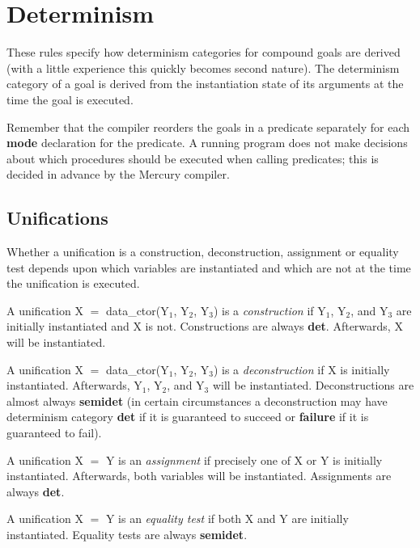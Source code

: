 \documentclass[a4paper,11pt,notitlepage,onecolumn]{book}
\begin{document}
\section{Determinism}

These rules specify how determinism categories for compound goals are
derived (with a little experience this quickly becomes second nature).
The determinism category of a goal is derived from the instantiation state
of its arguments at the time the goal is executed.

\Note Remember that the compiler reorders the goals in a predicate
separately for each \textsf{\textbf{mode}} declaration for the predicate.  A running program
does not make decisions about which procedures should be executed when
calling predicates; this is decided in advance by the Mercury compiler.

\subsection*{Unifications}

Whether a unification is a construction, deconstruction, assignment or
equality test depends upon which variables are instantiated and which are
not at the time the unification is executed.

A unification \textsf{X {\ensuremath{=}} data\_ctor(Y$_{1}$, Y$_{2}$, Y$_{3}$)} is a \emph{construction} if \textsf{Y$_{1}$},
\textsf{Y$_{2}$}, and \textsf{Y$_{3}$} are initially instantiated and \textsf{X} is not.  Constructions are
always \textsf{\textbf{det}}.  Afterwards, \textsf{X} will be instantiated.

A unification \textsf{X {\ensuremath{=}} data\_ctor(Y$_{1}$, Y$_{2}$, Y$_{3}$)} is a \emph{deconstruction} if \textsf{X}
is initially instantiated.  Afterwards, \textsf{Y$_{1}$}, \textsf{Y$_{2}$}, and \textsf{Y$_{3}$} will be
instantiated.  Deconstructions are almost always \textsf{\textbf{semidet}} (in certain
circumstances a deconstruction may have determinism category \textsf{\textbf{det}} if it is
guaranteed to succeed or \textsf{\textbf{failure}} if it is guaranteed to fail).

A unification \textsf{X {\ensuremath{=}} Y} is an \emph{assignment} if precisely one of \textsf{X} or \textsf{Y}
is initially instantiated.  Afterwards, both variables will be instantiated.
Assignments are always \textsf{\textbf{det}}.

A unification \textsf{X {\ensuremath{=}} Y} is an \emph{equality test} if both \textsf{X} and \textsf{Y} are
initially instantiated.  Equality tests are always \textsf{\textbf{semidet}}.
\end{document}
